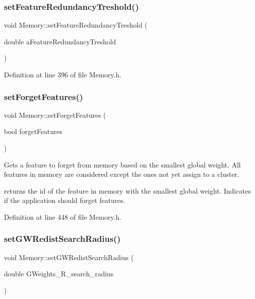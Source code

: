 \subsubsection{\texorpdfstring{set\+Feature\+Redundancy\+Treshold()}{setFeatureRedundancyTreshold()}}
{\footnotesize\ttfamily void Memory\+::set\+Feature\+Redundancy\+Treshold (\begin{DoxyParamCaption}\item[{double}]{a\+Feature\+Redundancy\+Treshold }\end{DoxyParamCaption})\hspace{0.3cm}{\ttfamily [inline]}}



Definition at line 396 of file Memory.\+h.

\mbox{\label{class_memory_a743603d575e4f65c0ca1292957fd9cf2}} 
\subsubsection{\texorpdfstring{set\+Forget\+Features()}{setForgetFeatures()}}
{\footnotesize\ttfamily void Memory\+::set\+Forget\+Features (\begin{DoxyParamCaption}\item[{bool}]{forget\+Features }\end{DoxyParamCaption})\hspace{0.3cm}{\ttfamily [inline]}}

Gets a feature to forget from memory based on the smallest global weight. All features in memory are considered except the ones not yet assign to a cluster.

returns the id of the feature in memory with the smallest global weight. Indicates if the application should forget features. 

Definition at line 448 of file Memory.\+h.

\mbox{\label{class_memory_afa0151bc0daa95b0c96aa2f5e750c7c4}} 
\subsubsection{\texorpdfstring{set\+G\+W\+Redist\+Search\+Radius()}{setGWRedistSearchRadius()}}
{\footnotesize\ttfamily void Memory\+::set\+G\+W\+Redist\+Search\+Radius (\begin{DoxyParamCaption}\item[{double}]{G\+Weights\+\_\+\+R\+\_\+search\+\_\+radius }\end{DoxyParamCaption})\hspace{0.3cm}{\ttfamily [inline]}}

